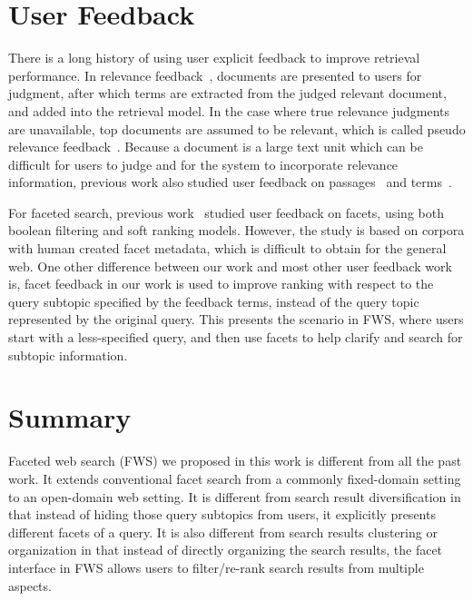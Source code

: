 \section{User Feedback}
There is a long history of using user explicit feedback to improve retrieval performance. In relevance feedback~\cite{rocchio71relevance,salton90improvingretrieval}, documents are presented to users for judgment, after which terms are extracted from the judged relevant document, and added into the retrieval model. In the case where true relevance judgments are unavailable, top documents are assumed to be relevant, which is called pseudo relevance feedback~\cite{buckley1995automatic,abdul2004umass}. Because a document is a large text unit which can be difficult for users to judge and for the system to incorporate relevance information, previous work also studied user feedback on passages~\cite{allan1995relevance,xu1996query} and terms~\cite{koenemann1996case,tan2007term}.

For faceted search, previous work~\cite{zhang2010interactive} studied user feedback on facets, using both boolean filtering and soft ranking models. However, the study is based on corpora with human created facet metadata, which is difficult to obtain for the general web. One other difference between our work and most other user feedback work is, facet feedback in our work is used to improve ranking with respect to the query subtopic specified by the feedback terms, instead of the query topic represented by the original query. This presents the scenario in FWS, where users start with a less-specified query, and then use facets to help clarify and search for subtopic information.

\section{Summary}
Faceted web search (FWS) we proposed in this work is different from all the past work. It extends conventional facet search from a commonly fixed-domain setting to an open-domain web setting. It is different from search result diversification in that instead of hiding those query subtopics from users, it explicitly presents different facets of a query. It is also different from search results clustering or organization in that instead of directly organizing the search results, the facet interface in FWS allows users to filter/re-rank search results from multiple aspects.

